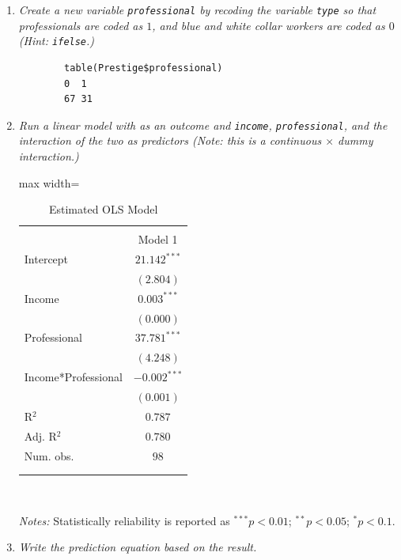 \documentclass[12pt,letterpaper]{article}
\begin{document}
	\newpage
	\begin{enumerate}
		
		\item [(a)]
		\textit{Create a new variable \texttt{professional} by recoding the variable \texttt{type} so that professionals are coded as $1$, and blue and white collar workers are coded as $0$ (Hint: \texttt{ifelse}.)}
		
		 
							
		\begin{verbatim}	
		table(Prestige$professional)
		0  1 
		67 31 
		\end{verbatim}
		
				 		\vspace{1cm}
		
		\item [(b)]
		\textit{Run a linear model with  as an outcome and \texttt{income}, \texttt{professional}, and the interaction of the two as predictors (Note: this is a continuous $\times$ dummy interaction.)}
				 		\vspace{.25cm}
				 		
				 				 

\begin{table}[h!] \centering 
			\caption{Estimated OLS Model}
	\label{tab:OLS}
	\begin{adjustbox}{max width=\textwidth}
		\begin{tabular}{l c}
			\\[1ex] \hline 
			\hline \\[-3ex] 
				& Model 1 \\
				\hline
Intercept           & $21.142^{***}$ \\
& $(2.804)$      \\
Income              & $0.003^{***}$  \\
& $(0.000)$      \\
Professional        & $37.781^{***}$ \\
& $(4.248)$      \\
Income*Professional & $-0.002^{***}$ \\
& $(0.001)$      \\
\hline
R$^2$               & $0.787$        \\
Adj. R$^2$          & $0.780$        \\
Num. obs.           & $98$           \\
			\\[-3ex]\hline 
\hline \\[-1.8ex] 
\end{tabular}
\end{adjustbox}
\\
\raggedright   \footnotesize{\textit{Notes:} Statistically reliability is reported as $^{***}p<0.01$; $^{**}p<0.05$; $^*p<0.1$.}
\end{table}
		\newpage
		\item [(c)]
		\textit{Write the prediction equation based on the result.}
		

\end{enumerate}
\end{document}
